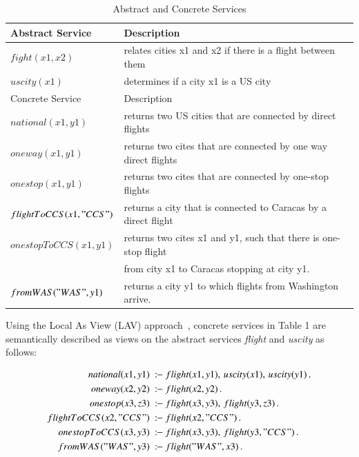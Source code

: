 \documentclass{llncs}
\newcommand{\qrule}{:\!\!-}
\begin{document}
\begin{table}
\begin{tabular}{| l| l |}
\hline
Abstract Service & Description \\
\hline
$fight(x1,x2)$ & relates cities x1 and x2 if there is a flight between them\\
\hline
$uscity(x1)$ &  determines if a city x1 is a US city\\
\hline \hline
Concrete  Service & Description \\
\hline
$national(x1,y1)$&  returns  two US cities that are connected by  direct flights \\
\hline
$oneway(x1,y1)$ & returns two cites that are connected by one way direct flights \\
\hline
$onestop(x1,y1)$ &  returns  two cites that are connected by one-stop flights \\
\hline
$ flightToCCS(x1,"CCS")$ & returns a city that is connected to  Caracas by a direct flight\\
 \hline
$ onestopToCCS(x1,y1)$ & returns two cites x1 and y1, such that there is  one-stop flight\\ 
 & from city x1 to Caracas stopping at city y1.\\
 \hline
 $fromWAS("WAS",y1)$ &  returns a city y1 to which flights from Washington arrive. \\
 \hline
\end{tabular}
\label{table:services}
\caption{Abstract and Concrete Services}
\end{table}

Using the  Local As View (LAV) approach~\cite{AmbiteISWC09}, concrete services in Table 1 are semantically described as views on the abstract services {\it flight} and {\it uscity} as follows:   

\begin{alignat*}{1}
national(x1,y1)\ &\qrule\ flight(x1,y1),\,  uscity(x1),\,  uscity(y1)\,. \\
oneway(x2,y2)\ &\qrule\ flight(x2,y2)\,. \\
onestop(x3,z3)\ &\qrule\ flight(x3,y3),\, flight(y3,z3)\,. \\
flightToCCS(x2,"CCS")\ &\qrule\ flight(x2,"CCS")\,. \\
onestopToCCS(x3,y3)\ &\qrule\ flight(x3,y3),\, flight(y3,"CCS")\,. \\
fromWAS("WAS",y3)\ &\qrule\ flight("WAS",x3)\,. \\
\end{alignat*}
\end{document}
